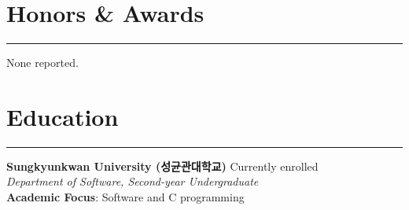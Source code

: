 \documentclass[letterpaper,10pt]{article}
\begin{document}
\section*{Honors \& Awards}
\hrule
\vspace{4pt}
None reported.

\section*{Education}
\hrule
\vspace{4pt}
\textbf{Sungkyunkwan University (성균관대학교)} \hfill Currently enrolled\\
\textit{Department of Software, Second-year Undergraduate}\\
\textbf{Academic Focus}: Software and C programming
\end{document}
